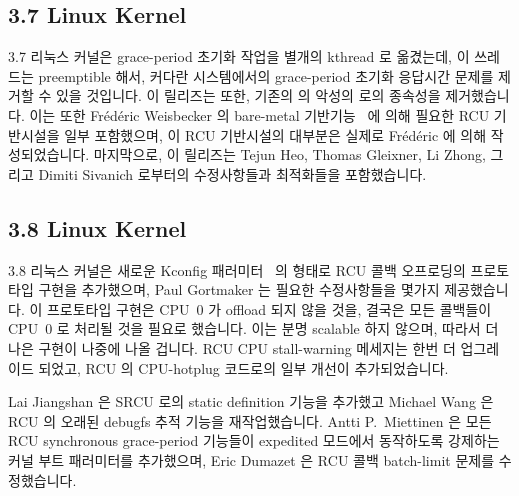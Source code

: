 \subsection{3.7 Linux Kernel}

3.7 리눅스 커널은 grace-period 초기화 작업을 별개의 kthread 로 옮겼는데, 이
쓰레드는 preemptible 해서, 커다란 시스템에서의 grace-period 초기화 응답시간
문제를 제거할 수 있을 것입니다.
이 릴리즈는 또한, 기존의  의 악성의 
로의 종속성을 제거했습니다.
이는 또한 Fr\'ed\'eric Weisbecker 의  bare-metal
기반기능~\cite{JonCorbet2013NO-HZ-FULL} 에 의해 필요한 RCU 기반시설을 일부
포함했으며, 이 RCU 기반시설의 대부분은 실제로 Fr\'ed\'eric 에 의해
작성되었습니다.
마지막으로, 이 릴리즈는 Tejun Heo, Thomas Gleixner, Li Zhong, 그리고 Dimiti
Sivanich 로부터의 수정사항들과 최적화들을 포함했습니다.

\subsection{3.8 Linux Kernel}

3.8 리눅스 커널은 새로운  Kconfig
패러미터~\cite{JonCorbet2012NOCB} 의 형태로 RCU 콜백 오프로딩의 프로토타입
구현을 추가했으며, Paul Gortmaker 는 필요한 수정사항들을 몇가지 제공했습니다.
이 프로토타입 구현은 CPU~0 가 offload 되지 않을 것을, 결국은 모든 콜백들이
CPU~0 로 처리될 것을 필요로 했습니다.
이는 분명 scalable 하지 않으며, 따라서 더 나은 구현이 나중에 나올 겁니다.
RCU CPU stall-warning 메세지는 한번 더 업그레이드 되었고, RCU 의 CPU-hotplug
코드로의 일부 개선이 추가되었습니다.

Lai Jiangshan 은 SRCU 로의 static definition 기능을 추가했고 Michael Wang 은
RCU 의 오래된 debugfs 추적 기능을 재작업했습니다.
Antti P.~Miettinen 은 모든 RCU synchronous grace-period 기능들이 expedited
모드에서 동작하도록 강제하는 커널 부트 패러미터를 추가했으며, Eric Dumazet 은
RCU 콜백 batch-limit 문제를 수정했습니다.
\iffalse

